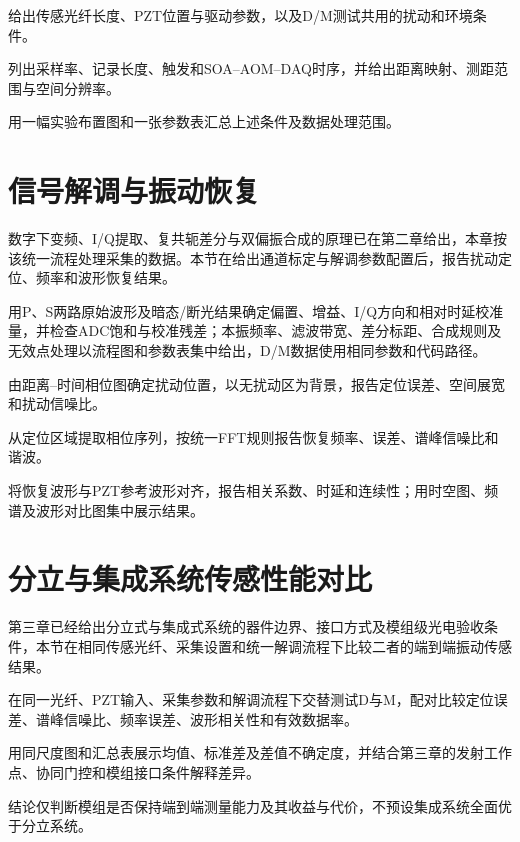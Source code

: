 \begin{writingplan}
  \item 给出传感光纤长度、PZT位置与驱动参数，以及D/M测试共用的扰动和环境条件。
  \item 列出采样率、记录长度、触发和SOA--AOM--DAQ时序，并给出距离映射、测距范围与空间分辨率。
  \item 用一幅实验布置图和一张参数表汇总上述条件及数据处理范围。
\end{writingplan}

\section{信号解调与振动恢复}
\label{sec:chap4_channel_calibration}
\label{sec:chap4_fixed_demod}

数字下变频、I/Q提取、复共轭差分与双偏振合成的原理已在第二章给出，本章按该统一流程处理采集的数据。本节在给出通道标定与解调参数配置后，报告扰动定位、频率和波形恢复结果。

\begin{writingplan}
  \item 用P、S两路原始波形及暗态/断光结果确定偏置、增益、I/Q方向和相对时延校准量，并检查ADC饱和与校准残差；本振频率、滤波带宽、差分标距、合成规则及无效点处理以流程图和参数表集中给出，D/M数据使用相同参数和代码路径。
  \item 由距离--时间相位图确定扰动位置，以无扰动区为背景，报告定位误差、空间展宽和扰动信噪比。
  \item 从定位区域提取相位序列，按统一FFT规则报告恢复频率、误差、谱峰信噪比和谐波。
  \item 将恢复波形与PZT参考波形对齐，报告相关系数、时延和连续性；用时空图、频谱及波形对比图集中展示结果。
\end{writingplan}

\section{分立与集成系统传感性能对比}

第三章已经给出分立式与集成式系统的器件边界、接口方式及模组级光电验收条件，本节在相同传感光纤、采集设置和统一解调流程下比较二者的端到端振动传感结果。

\begin{writingplan}
  \item 在同一光纤、PZT输入、采集参数和解调流程下交替测试D与M，配对比较定位误差、谱峰信噪比、频率误差、波形相关性和有效数据率。
  \item 用同尺度图和汇总表展示均值、标准差及差值不确定度，并结合第三章的发射工作点、协同门控和模组接口条件解释差异。
  \item 结论仅判断模组是否保持端到端测量能力及其收益与代价，不预设集成系统全面优于分立系统。
\end{writingplan}

